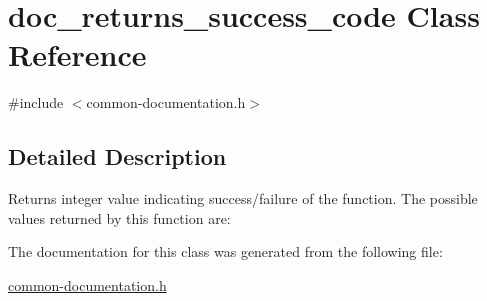 \hypertarget{classdoc__returns__success__code}{}\section{doc\+\_\+returns\+\_\+success\+\_\+code Class Reference}
\label{classdoc__returns__success__code}


{\ttfamily \#include $<$common-\/documentation.\+h$>$}



\subsection{Detailed Description}
\begin{DoxyReturn}{Returns}
integer value indicating success/failure of the function. The possible values returned by this function are\+: 
\end{DoxyReturn}


The documentation for this class was generated from the following file\+:\begin{DoxyCompactItemize}
\item 
\hyperlink{common-documentation_8h}{common-\/documentation.\+h}\end{DoxyCompactItemize}
